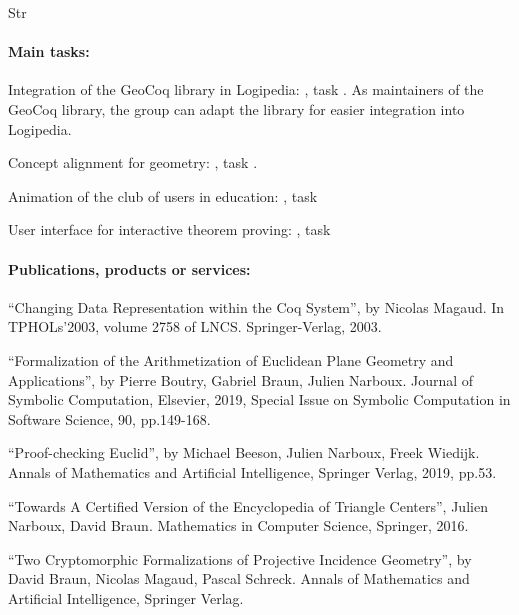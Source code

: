 \begin{sitedescription}{Str}
\paragraph*{Main tasks:}

\begin{compactitem}
\item Integration of the GeoCoq library in Logipedia: , task . As maintainers of the GeoCoq library, the group can adapt the library for easier integration into Logipedia.
\item Concept alignment for geometry: , task . 
\item Animation of the club of users in education: , task  
\item User interface for interactive theorem proving: , task 
\end{compactitem}

\paragraph*{Publications, products or services:}

\begin{compactitem}
\item ``Changing Data Representation within the Coq System'', by Nicolas Magaud. In TPHOLs'2003, volume 2758 of LNCS. Springer-Verlag, 2003.
\item ``Formalization of the Arithmetization of Euclidean Plane Geometry and Applications'', by Pierre Boutry, Gabriel Braun, Julien Narboux. Journal of Symbolic Computation, Elsevier, 2019, Special Issue on Symbolic Computation in Software Science, 90, pp.149-168.
\item ``Proof-checking Euclid'', by Michael Beeson, Julien Narboux, Freek Wiedijk. Annals of Mathematics and Artificial Intelligence, Springer Verlag, 2019, pp.53.
\item ``Towards A Certified Version of the Encyclopedia of Triangle Centers'', Julien Narboux, David Braun. Mathematics in Computer Science, Springer, 2016.
\item ``Two Cryptomorphic Formalizations of Projective Incidence Geometry'', by David Braun, Nicolas Magaud, Pascal Schreck. Annals of Mathematics and Artificial Intelligence, Springer Verlag.
\end{compactitem}


\end{sitedescription}
